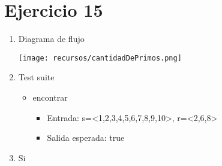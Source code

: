 \documentclass{article}
\begin{document}
\section*{Ejercicio 15}

\begin{enumerate}
    \item Diagrama de flujo
    
    \texttt{[image: recursos/cantidadDePrimos.png]}

    \item Test suite
        \begin{itemize}
            \item encontrar
                \begin{itemize}
                    \item Entrada: s=<1,2,3,4,5,6,7,8,9,10>, r=<2,6,8>
                    \item Salida esperada: true
                \end{itemize}
        \end{itemize}
    \item Si
\end{enumerate}
\end{document}
